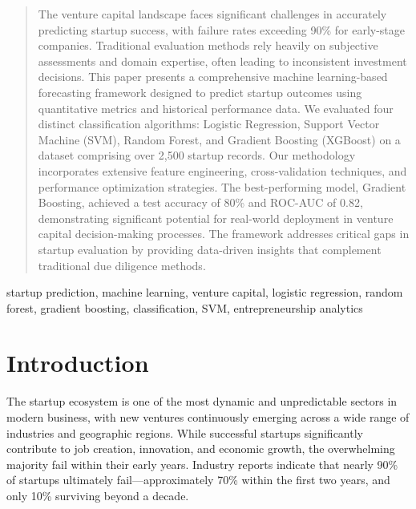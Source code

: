 \documentclass[conference]{IEEEtran}
\begin{document}
\maketitle

\begin{abstract}
The venture capital landscape faces significant challenges in accurately predicting startup success, with failure rates exceeding 90\% for early-stage companies. Traditional evaluation methods rely heavily on subjective assessments and domain expertise, often leading to inconsistent investment decisions. This paper presents a comprehensive machine learning-based forecasting framework designed to predict startup outcomes using quantitative metrics and historical performance data. We evaluated four distinct classification algorithms: Logistic Regression, Support Vector Machine (SVM), Random Forest, and Gradient Boosting (XGBoost) on a dataset comprising over 2,500 startup records. Our methodology incorporates extensive feature engineering, cross-validation techniques, and performance optimization strategies. The best-performing model, Gradient Boosting, achieved a test accuracy of 80\% and ROC-AUC of 0.82, demonstrating significant potential for real-world deployment in venture capital decision-making processes. The framework addresses critical gaps in startup evaluation by providing data-driven insights that complement traditional due diligence methods.
\end{abstract}

\begin{IEEEkeywords}
startup prediction, machine learning, venture capital, logistic regression, random forest, gradient boosting, classification, SVM, entrepreneurship analytics
\end{IEEEkeywords}

\section{Introduction}

The startup ecosystem is one of the most dynamic and unpredictable sectors in modern business, with new ventures continuously emerging across a wide range of industries and geographic regions. While successful startups significantly contribute to job creation, innovation, and economic growth, the overwhelming majority fail within their early years. Industry reports indicate that nearly 90\% of startups ultimately fail—approximately 70\% within the first two years, and only 10\% surviving beyond a decade.
\end{document}
